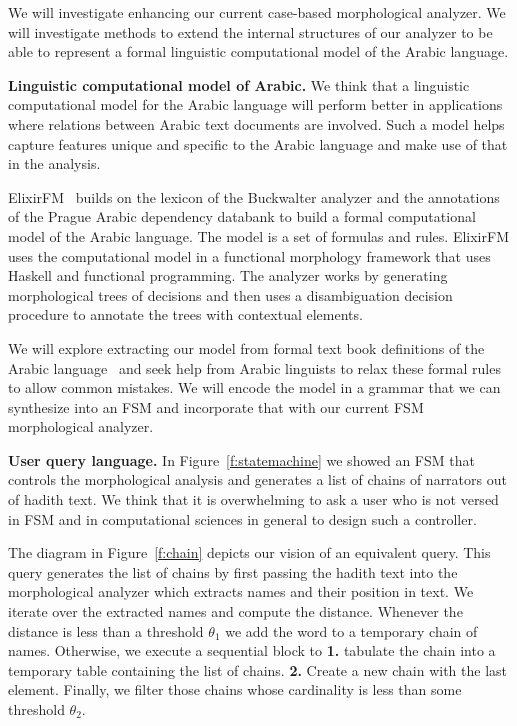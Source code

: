\documentclass[12pt]{article}
\begin{document}
We will investigate enhancing our current case-based morphological
analyzer.
We will investigate methods to extend the internal structures 
of our analyzer to be able to represent a formal linguistic
computational model of the Arabic language. 

{\bf Linguistic computational model of Arabic.}
We think that a linguistic computational model for the Arabic
language will perform better in applications where
relations between Arabic text documents are involved. 
Such a model helps capture features unique and specific 
to the Arabic language and make use of that in the analysis.

ElixirFM~\cite{Otakar:07} builds on the lexicon
of the Buckwalter analyzer and the annotations of the 
Prague Arabic dependency databank to build a formal 
computational model of the Arabic language.
The model is a set of formulas and rules. 
ElixirFM uses the computational model in a functional
morphology framework that uses Haskell and functional
programming. 
The analyzer works by generating morphological trees of 
decisions and then uses a disambiguation decision procedure 
to annotate the trees with contextual elements. 

We will explore extracting our model from formal text book
definitions of the Arabic language~\cite{Abd00,Abd001} and seek
help from Arabic linguists to relax these formal rules to
allow common mistakes. 
We will encode the model in a grammar that we can synthesize
into an FSM and incorporate that with our current FSM 
morphological analyzer. 


{\bf User query language. }
In Figure~\ref{f:statemachine} we showed an FSM 
that controls the morphological analysis and generates a
list of chains of narrators out of hadith text.
We think that it is overwhelming to ask a user who is not 
versed in FSM and in computational sciences in general 
to design such a controller. 

The diagram in Figure~\ref{f:chain} depicts our vision of 
an equivalent query.
This query generates the list of chains by first passing the 
hadith text into the morphological analyzer which 
extracts names and their position in text. 
We iterate over the extracted names and compute the distance.
Whenever the distance is less than a threshold $\theta_1$
we add the word to a temporary chain of names. 
Otherwise, we execute a sequential block to 
{\bf 1.} tabulate the chain into a temporary table containing 
the list of chains. 
{\bf 2.} Create a new chain with the last element.
Finally, we filter those chains whose cardinality 
is less than some threshold  $\theta_2$.
\end{document}
